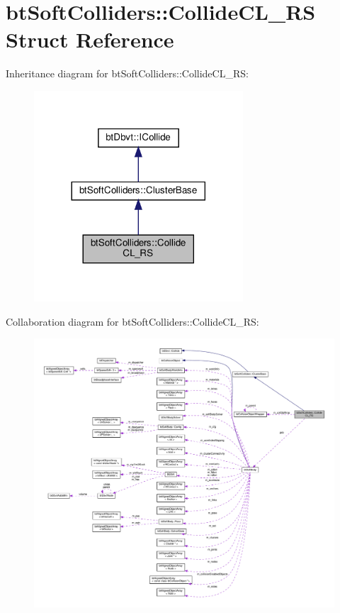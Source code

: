 \hypertarget{structbtSoftColliders_1_1CollideCL__RS}{}\section{bt\+Soft\+Colliders\+:\+:Collide\+C\+L\+\_\+\+RS Struct Reference}
\label{structbtSoftColliders_1_1CollideCL__RS}


Inheritance diagram for bt\+Soft\+Colliders\+:\+:Collide\+C\+L\+\_\+\+RS\+:
\nopagebreak
\begin{figure}[H]
\begin{center}
\leavevmode
\includegraphics[width=221pt]{structbtSoftColliders_1_1CollideCL__RS__inherit__graph}
\end{center}
\end{figure}


Collaboration diagram for bt\+Soft\+Colliders\+:\+:Collide\+C\+L\+\_\+\+RS\+:
\nopagebreak
\begin{figure}[H]
\begin{center}
\leavevmode
\includegraphics[width=350pt]{structbtSoftColliders_1_1CollideCL__RS__coll__graph}
\end{center}
\end{figure}

